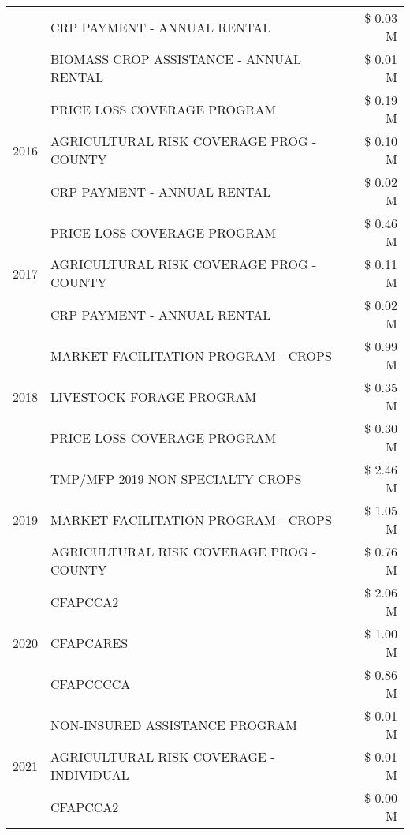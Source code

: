 \begin{tabular}{llr}
 & CRP PAYMENT - ANNUAL RENTAL & \$ 0.03 M \\
 & BIOMASS CROP ASSISTANCE - ANNUAL RENTAL & \$ 0.01 M \\
\cline{1-3}
\multirow[t]{3}{*}{2016} & PRICE LOSS COVERAGE PROGRAM & \$ 0.19 M \\
 & AGRICULTURAL RISK COVERAGE PROG - COUNTY & \$ 0.10 M \\
 & CRP PAYMENT - ANNUAL RENTAL & \$ 0.02 M \\
\cline{1-3}
\multirow[t]{3}{*}{2017} & PRICE LOSS COVERAGE PROGRAM & \$ 0.46 M \\
 & AGRICULTURAL RISK COVERAGE PROG - COUNTY & \$ 0.11 M \\
 & CRP PAYMENT - ANNUAL RENTAL & \$ 0.02 M \\
\cline{1-3}
\multirow[t]{3}{*}{2018} & MARKET FACILITATION PROGRAM - CROPS & \$ 0.99 M \\
 & LIVESTOCK FORAGE PROGRAM & \$ 0.35 M \\
 & PRICE LOSS COVERAGE PROGRAM & \$ 0.30 M \\
\cline{1-3}
\multirow[t]{3}{*}{2019} & TMP/MFP 2019 NON SPECIALTY CROPS & \$ 2.46 M \\
 & MARKET FACILITATION PROGRAM - CROPS & \$ 1.05 M \\
 & AGRICULTURAL RISK COVERAGE PROG - COUNTY & \$ 0.76 M \\
\cline{1-3}
\multirow[t]{3}{*}{2020} & CFAPCCA2 & \$ 2.06 M \\
 & CFAPCARES & \$ 1.00 M \\
 & CFAPCCCCA & \$ 0.86 M \\
\cline{1-3}
\multirow[t]{3}{*}{2021} & NON-INSURED ASSISTANCE PROGRAM & \$ 0.01 M \\
 & AGRICULTURAL RISK COVERAGE - INDIVIDUAL & \$ 0.01 M \\
 & CFAPCCA2 & \$ 0.00 M \\
\cline{1-3}
\bottomrule
\end{tabular}
